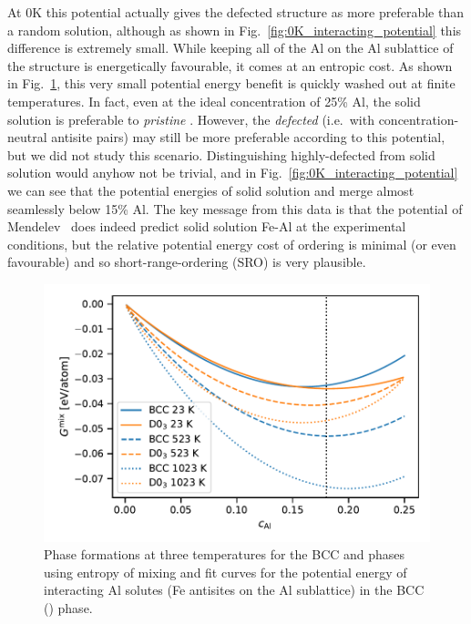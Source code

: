 At 0K this potential actually gives the defected \DOTHREE structure as more preferable than a random solution, although as shown in Fig.~\ref{fig:0K_interacting_potential} this difference is extremely small.
While keeping all of the Al on the Al sublattice of the \DOTHREE structure is energetically favourable, it comes at an entropic cost.
As shown in Fig.~\ref{fig:0K_interacting_mixing}, this very small potential energy benefit is quickly washed out at finite temperatures.
In fact, even at the ideal \DOTHREE concentration of 25\% Al, the solid solution is preferable to \emph{pristine} \DOTHREE.
However, the \emph{defected} \DOTHREE (i.e.~with concentration-neutral antisite pairs) may still be more preferable according to this potential, but we did not study this scenario.
Distinguishing highly-defected \DOTHREE from solid solution would anyhow not be trivial, and in Fig.~\ref{fig:0K_interacting_potential} we can see that the potential energies of solid solution and \DOTHREE merge almost seamlessly below 15\% Al.
The key message from this data is that the potential of Mendelev \etal~does indeed predict solid solution Fe-Al at the experimental conditions, but the relative potential energy cost of \DOTHREE ordering is minimal (or even favourable) and so short-range-ordering (SRO) is very plausible.
%
\begin{figure}[h]
    \centering
    \includegraphics[width=\textwidth]{figures/zerok_interacting_defect_mixing}
    \caption{Phase formations at three temperatures for the BCC and \DOTHREE phases using entropy of mixing and fit curves for the potential energy of interacting Al solutes (Fe antisites on the Al sublattice) in the BCC (\DOTHREE) phase.}
    \label{fig:0K_interacting_mixing}
\end{figure}
%


